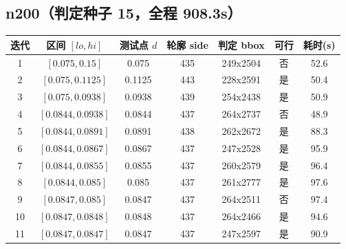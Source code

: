 \documentclass[12pt,a4paper]{article}
\begin{document}
\subsection{n200（判定种子 15，全程 908.3s）}
\begin{table}[H]
\centering
\scriptsize
\setlength{\tabcolsep}{2.5pt}
\begin{tabular}{ccccccc}
\toprule
迭代 & 区间 $[lo, hi]$ & 测试点 $d$ & 轮廓 side & 判定 bbox & 可行 & 耗时(s) \\
\midrule
1 & $[0.075,0.15]$ & 0.075 & 435 & 249x2504 & 否 & 52.6 \\
2 & $[0.075,0.1125]$ & 0.1125 & 443 & 228x2591 & 是 & 50.4 \\
3 & $[0.075,0.0938]$ & 0.0938 & 439 & 254x2438 & 是 & 50.9 \\
4 & $[0.0844,0.0938]$ & 0.0844 & 437 & 264x2737 & 否 & 48.9 \\
5 & $[0.0844,0.0891]$ & 0.0891 & 438 & 262x2672 & 是 & 88.3 \\
6 & $[0.0844,0.0867]$ & 0.0867 & 437 & 247x2528 & 是 & 95.9 \\
7 & $[0.0844,0.0855]$ & 0.0855 & 437 & 260x2579 & 是 & 96.4 \\
8 & $[0.0844,0.085]$ & 0.085 & 437 & 261x2777 & 是 & 97.6 \\
9 & $[0.0847,0.085]$ & 0.0847 & 437 & 264x2511 & 否 & 97.4 \\
10 & $[0.0847,0.0848]$ & 0.0848 & 437 & 264x2466 & 是 & 94.6 \\
11 & $[0.0847,0.0847]$ & 0.0847 & 437 & 247x2597 & 是 & 90.9 \\
\bottomrule
\end{tabular}
\end{table}
\end{document}
